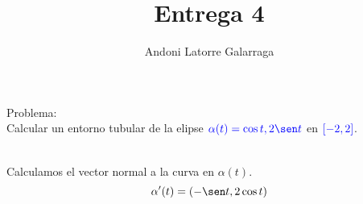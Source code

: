 \documentclass{article}
\title{Entrega 4}
\author{Andoni Latorre Galarraga}
\date{}
\begin{document}
\maketitle
\begin{multicols}{2}
\textcolor{WildStrawberry}{Problema:}\\
Calcular un entorno tubular de la elipse $\textcolor{blue}{\alpha(t)=\cos t, 2 \sen t}$ en $\textcolor{blue}{[-2,2]}$.\\
\\
Calculamos el vector normal a la curva en $\alpha(t)$.
$$
\alpha'(t) = (-\sen t, 2\cos t)
$$

\end{multicols}
\end{document}
